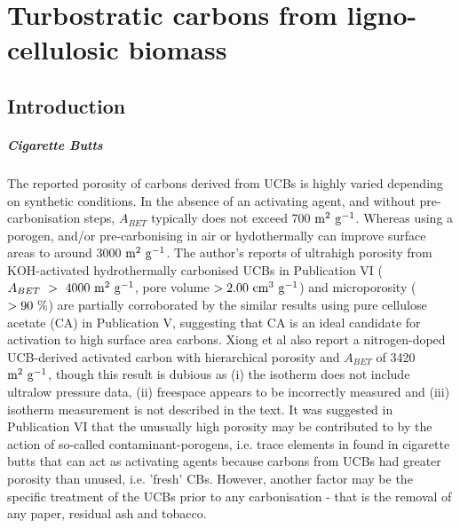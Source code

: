 \chapter{Turbostratic carbons from ligno-cellulosic biomass}
\label{ch:syntheses}

\newpage

\section{Introduction}

\paragraph{Cigarette Butts} %


The reported porosity of carbons derived from UCBs is highly varied depending on synthetic conditions. In the absence of an activating agent, and without pre-carbonisation steps, $A_{BET}$ typically does not exceed 700 $\rm m^2\ g^{-1}$.\citep{Koochaki2019, Soltani2013, Yazdi2012, Lee2014, Hamzah2017} Whereas using a porogen, and/or pre-carbonising in air or hydothermally can improve surface areas to around 3000 $\rm m^2\ g^{-1}$.\citep{xiong2018, Koochaki2019, Sun2017, Bilge2019} The author's reports of ultrahigh porosity from KOH-activated hydrothermally carbonised UCBs in Publication VI ($A_{BET}\ \rm >\ 4000\ m^2\ g^{-1} $, pore volume $\rm > 2.00\ cm^3\ g^{-1}$) and microporosity ($\rm > 90\ \%$) are partially corroborated by the similar results using pure cellulose acetate (CA) in Publication V, suggesting that CA is an ideal candidate for activation to high surface area carbons. Xiong et al also report a nitrogen-doped UCB-derived activated carbon with hierarchical porosity and $A_{BET}$ of 3420 $\rm m^2\ g^{-1}$, though this result is dubious as (i) the  isotherm does not include ultralow pressure data, (ii) freespace appears to be incorrectly measured and (iii) isotherm measurement is not described in the text.\citep{xiong2019nitrogen} It was suggested in Publication VI that the unusually high porosity may be contributed to by the action of so-called contaminant-porogens, i.e. trace elements in found in cigarette butts that can act as activating agents because carbons from UCBs had greater porosity than unused, i.e. 'fresh' CBs. However, another factor may be the specific treatment of the UCBs prior to any carbonisation - that is the removal of any paper, residual ash and tobacco.

